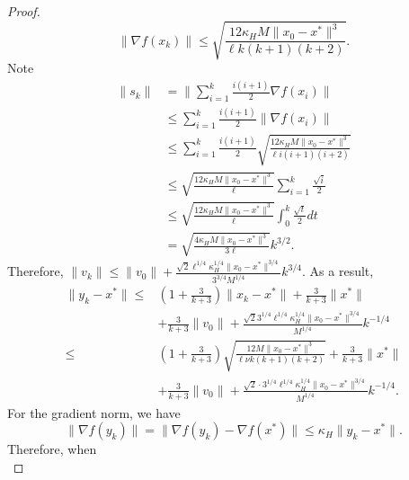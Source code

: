 \documentclass{mcom-l}
\numberwithin{equation}{section}
\begin{document}
\begin{proof}
\begin{equation*}
        \|\nabla f(x_k)\|\leq \sqrt{\frac{12\kappa_H M\|x_0-x^*\|^3}{\ell k(k+1)(k+2)}}.
    \end{equation*}
    Note
    \begin{equation*}
        \begin{aligned}
            \|s_k\| & =\|\sum_{i=1}^k\frac{i(i+1)}{2}\nabla f(x_i)\|                                             \\
                    & \leq \sum_{i=1}^k \frac{i(i+1)}{2}\|\nabla f(x_i)\|                                        \\
                    & \leq \sum_{i=1}^k\frac{i(i+1)}{2}\sqrt{\frac{12\kappa_H M\|x_0-x^*\|^3}{\ell i(i+1)(i+2)}} \\
                    & \leq \sqrt{\frac{12\kappa_H M\|x_0-x^*\|^3}{\ell}}\sum_{i=1}^k\frac{\sqrt{i}}{2}           \\
                    & \leq \sqrt{\frac{12\kappa_H M\|x_0-x^*\|^3}{\ell}}\int_0^k \frac{\sqrt{t}}{2}dt            \\
                    & =\sqrt{\frac{4\kappa_H M\|x_0-x^*\|^3}{3\ell}}k^{3/2}.
        \end{aligned}
    \end{equation*}
    Therefore, $\|v_k\|\leq \|v_0\|+\frac{\sqrt{2}\ell^{1/4}\kappa_H^{1/4}\|x_0-x^*\|^{3/4}}{3^{3/4}M^{1/4}}k^{3/4}$. As a result,
    \begin{equation}
        \label{eq.bound yk}
        \begin{aligned}
            \|y_k-x^*\|\leq & (1+\frac{3}{k+3})\|x_k-x^*\|+\frac{3}{k+3}\|x^*\|                                                      \\
                            & +\frac{3}{k+3}\|v_0\|+\frac{\sqrt{2}3^{1/4}\ell^{1/4}\kappa_H^{1/4}\|x_0-x^*\|^{3/4}}{M^{1/4}}k^{-1/4} \\
            \leq            & (1+\frac{3}{k+3})\sqrt{\frac{12M\|x_0-x^*\|^3}{\ell\nu k(k+1)(k+2)}}+\frac{3}{k+3}\|x^*\|              \\&
            +\frac{3}{k+3}\|v_0\|+\frac{\sqrt{2}\cdot3^{1/4}\ell^{1/4}\kappa_H^{1/4}\|x_0-x^*\|^{3/4}}{M^{1/4}}k^{-1/4}.
        \end{aligned}
    \end{equation}
    For the gradient norm, we have
    \begin{equation*}
        \|\nabla f(y_k)\| = \|\nabla f(y_k)-\nabla f(x^*)\|\leq \kappa_H\|y_k-x^*\|.
    \end{equation*}
    Therefore, when
    \begin{equation}\label{eq.quadratic region guarantee}

\end{equation}
\end{proof}
\end{document}
